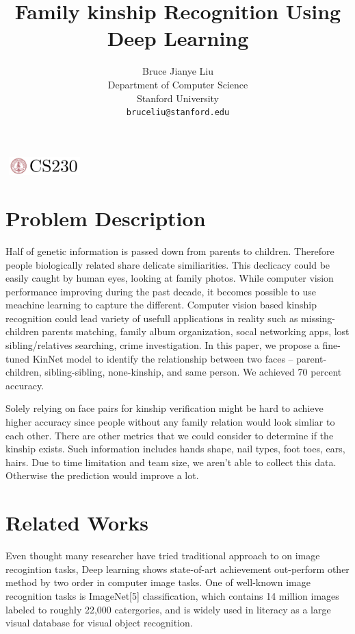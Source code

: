\documentclass{article}
\title{Family kinship Recognition Using Deep Learning}
\author{
  Bruce Jianye Liu\\
  Department of Computer Science\\
  Stanford University\\
  \texttt{bruceliu@stanford.edu} \\
}
\begin{document}

\begin{center}
\includegraphics[width=3cm, height=0.7cm]{CS230}
\end{center}

\maketitle

\section{Problem Description}
Half of genetic information is passed down from parents to children. Therefore
people biologically related share delicate similiarities. This declicacy could
be easily caught by human eyes, looking at family photos. While computer vision
performance improving during the past decade, it becomes possible to use
meachine learning to capture the different. Computer vision based kinship
recognition could lead variety of usefull applications in reality such as
missing-children parents matching, family album organization, socal networking
apps, lost sibling/relatives searching, crime investigation. In this paper, we
propose a fine-tuned KinNet model to identify the relationship between two
faces -- parent-children, sibling-sibling, none-kinship, and same person. We
achieved 70 percent accuracy.

Solely relying on face pairs for kinship verification might be hard to achieve
higher accuracy since people without any family relation would look simliar to
each other. There are other metrics that we could consider to determine if the
kinship exists. Such information includes hands shape, nail types, foot toes,
ears, hairs. Due to time limitation and team size, we aren't able to collect
this data. Otherwise the prediction would improve a lot.

\section{Related Works}

Even thought many researcher have tried traditional approach to on image
recogintion tasks, Deep learning shows state-of-art achievement out-perform
other method by two order in computer image tasks. One of well-known image
recognition tasks is ImageNet[5] classification, which contains 14
million images labeled to roughly 22,000 catergories, and is widely used in
literacy as a large visual database for visual object recognition.
\end{document}

